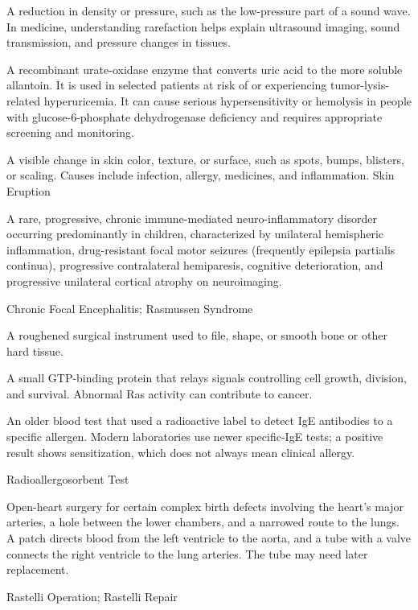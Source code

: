  A reduction in density or pressure, such as the low-pressure part of a sound wave. In medicine, understanding rarefaction helps explain ultrasound imaging, sound transmission, and pressure changes in tissues.

 A recombinant urate-oxidase enzyme that converts uric acid to the more soluble allantoin. It is used
in selected patients at risk of or experiencing tumor-lysis-related hyperuricemia. It can
cause serious hypersensitivity or hemolysis in people with glucose-6-phosphate
dehydrogenase deficiency and requires appropriate screening and monitoring.

 A visible change in skin color, texture, or surface, such as spots, bumps, blisters, or scaling. Causes include infection, allergy, medicines, and inflammation.
\synonyms
Skin Eruption

 A rare, progressive, chronic immune-mediated neuro-inflammatory disorder occurring predominantly in children, characterized by unilateral hemispheric inflammation, drug-resistant focal motor seizures (frequently epilepsia partialis continua), progressive contralateral hemiparesis, cognitive deterioration, and progressive unilateral cortical atrophy on neuroimaging.

\synonyms
Chronic Focal Encephalitis; Rasmussen Syndrome

 A roughened surgical instrument used to file, shape, or smooth bone or other hard tissue.

 A small GTP-binding protein that relays signals controlling cell growth, division, and survival. Abnormal Ras activity can contribute to cancer.

 An older blood test that used a radioactive label to detect IgE antibodies to a specific allergen. Modern laboratories use newer specific-IgE tests; a positive result shows sensitization, which does not always mean clinical allergy.

\synonyms
Radioallergosorbent Test

 Open-heart surgery for certain complex birth defects involving the heart’s major arteries, a hole between the lower chambers, and a narrowed route to the lungs. A patch directs blood from the left ventricle to the aorta, and a tube with a valve connects the right ventricle to the lung arteries. The tube may need later replacement.

\synonyms
Rastelli Operation; Rastelli Repair

